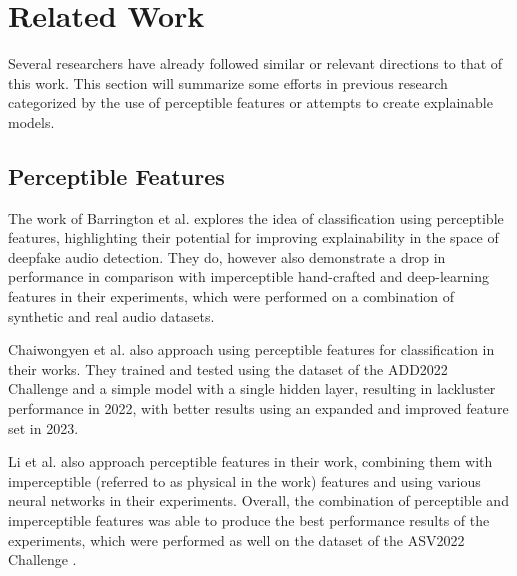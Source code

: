 \documentclass{article}
\begin{document}
	\section{Related Work}
	Several researchers have already followed similar or relevant directions to that of this work.
	This section will summarize some efforts in previous research categorized by the use of
	perceptible features or attempts to create explainable models.
	\subsection{Perceptible Features}
	The work of Barrington et al. \cite{barrington_single_2023} explores the idea of classification
	using perceptible features, highlighting their potential for improving explainability in the
	space of deepfake audio detection. They do, however also demonstrate a drop in performance in
	comparison with imperceptible hand-crafted and deep-learning features in their experiments,
	which were performed on a combination of synthetic and real audio datasets.
	\par
	Chaiwongyen et al. \cite{chaiwongyen_contribution_2022,chaiwongyen_deepfake-speech_2023} also
	approach using perceptible features for classification in their works. They trained and tested
	using the dataset of the ADD2022 Challenge \cite{yi_add_2024} and a simple model with a single
	hidden layer, resulting in lackluster performance in 2022, with better results using an
	expanded and improved feature set in 2023.
	\par
	Li et al. \cite{li_comparative_2022} also approach
	perceptible features in their work, combining them with imperceptible (referred to as physical
	in the work) features and using various neural networks in their experiments. Overall, the
	combination of perceptible and imperceptible features was able to produce the best performance
	results of the experiments, which were performed as well on the dataset of the ASV2022
	Challenge \cite{yi_add_2024}.
\end{document}

